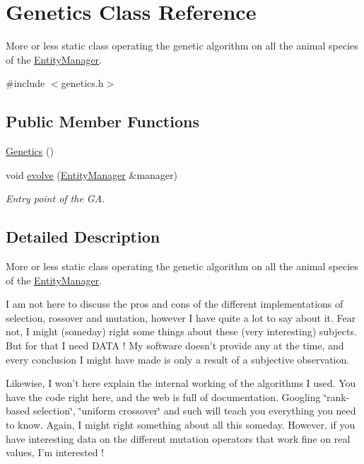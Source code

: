 \hypertarget{class_genetics}{\section{Genetics Class Reference}
\label{class_genetics}
}


More or less static class operating the genetic algorithm on all the animal species of the \hyperlink{class_entity_manager}{Entity\-Manager}.  




{\ttfamily \#include $<$genetics.\-h$>$}

\subsection*{Public Member Functions}
\begin{DoxyCompactItemize}
\item 
\hyperlink{class_genetics_a7c9a65ee1c7da6bbb4b35d46d1dcf4fa}{Genetics} ()
\item 
void \hyperlink{class_genetics_a63e33bd3725feb511e19d86e2d07ca3b}{evolve} (\hyperlink{class_entity_manager}{Entity\-Manager} \&manager)
\begin{DoxyCompactList}\small\item\em Entry point of the G\-A. \end{DoxyCompactList}\end{DoxyCompactItemize}


\subsection{Detailed Description}
More or less static class operating the genetic algorithm on all the animal species of the \hyperlink{class_entity_manager}{Entity\-Manager}. 

I am not here to discuss the pros and cons of the different implementations of selection, rossover and mutation, however I have quite a lot to say about it. Fear not, I might (someday) right some things about these (very interesting) subjects. But for that I need D\-A\-T\-A ! My software doesn't provide any at the time, and every conclusion I might have made is only a result of a subjective observation.

Likewise, I won't here explain the internal working of the algorithms I used. You have the code right here, and the web is full of documentation. Googling \char`\"{}rank-\/based selection\char`\"{}, \char`\"{}uniform crossover\char`\"{} and such will teach you everything you need to know. Again, I might right something about all this someday. However, if you have interesting data on the different mutation operators that work fine on real values, I'm interested !

